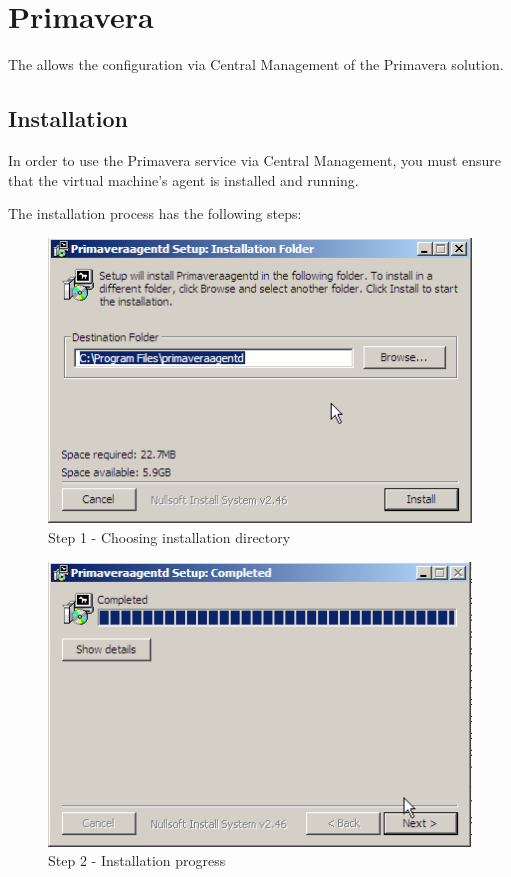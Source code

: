 \section{Primavera}
The \acronym allows the configuration via Central Management of the Primavera solution.

\subsection{Installation}
In order to use the Primavera service via Central Management, you must ensure that the virtual machine's agent is installed and running.

The installation process has the following steps:

\begin{figure}[H]
    \begin{center}
    \includegraphics[scale=0.6]{screenshots/primavera/primaverainstall_01.png}
    \caption{Step 1 - Choosing installation directory}
    \label{fig:primavera_install_passo1}
    \end{center}
\end{figure}

\begin{figure}[H]
    \begin{center}
    \includegraphics[scale=0.6]{screenshots/primavera/primaverainstall_02.png}
    \caption{Step 2 - Installation progress}
    \label{fig:primavera_install_passo2}
    \end{center}
\end{figure}

